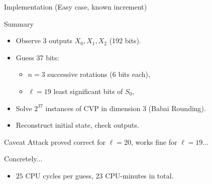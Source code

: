 \begin{frame}{Implementation (Easy case, known increment)}
  \begin{block}{Summary}
    \begin{itemize}
    \item Observe 3 outputs $X_0, X_1, X_2$ (192 bits).
    \item Guess 37 bits:
      \begin{itemize}
      \item \(n=3\) successive rotations (6 bits each),
      \item \(\ell=19\) least significant bits of \(S_0\),
      \end{itemize}
    \item Solve \(2^{37}\) instances of CVP in dimension 3 (Babai Rounding).
    \item Reconstruct initial state, check outputs.
    \end{itemize}
  \end{block}

  \begin{alertblock}{Caveat}
    Attack proved correct for $\ell=20$, works fine for $\ell=19$...
  \end{alertblock}
  
  \begin{exampleblock}{Concretely...}
    \begin{itemize}
    \item $25$ CPU cycles per guess, 23 CPU-minutes in total.
    \end{itemize}
  \end{exampleblock}  
\end{frame}


